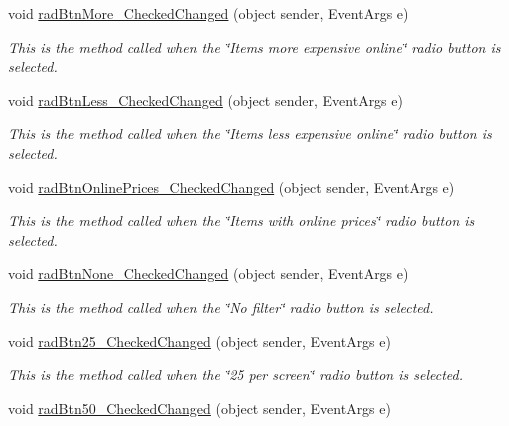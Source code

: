 \begin{DoxyCompactItemize}
void \hyperlink{class_price_comparison_form_1_1_form_price_compare_ac75092e889f0bd6a39d17568f17a17cf}{rad\-Btn\-More\-\_\-\-Checked\-Changed} (object sender, Event\-Args e)
\begin{DoxyCompactList}\small\item\em This is the method called when the \char`\"{}\-Items more expensive online\char`\"{} radio button is selected. \end{DoxyCompactList}\item 
void \hyperlink{class_price_comparison_form_1_1_form_price_compare_a0d825368f057d393f614a356593f2d6e}{rad\-Btn\-Less\-\_\-\-Checked\-Changed} (object sender, Event\-Args e)
\begin{DoxyCompactList}\small\item\em This is the method called when the \char`\"{}\-Items less expensive online\char`\"{} radio button is selected. \end{DoxyCompactList}\item 
void \hyperlink{class_price_comparison_form_1_1_form_price_compare_a71a2eec3243229776da307604a2931f6}{rad\-Btn\-Online\-Prices\-\_\-\-Checked\-Changed} (object sender, Event\-Args e)
\begin{DoxyCompactList}\small\item\em This is the method called when the \char`\"{}\-Items with online prices\char`\"{} radio button is selected. \end{DoxyCompactList}\item 
void \hyperlink{class_price_comparison_form_1_1_form_price_compare_af88870be67736e2c4780b9db680a6f1d}{rad\-Btn\-None\-\_\-\-Checked\-Changed} (object sender, Event\-Args e)
\begin{DoxyCompactList}\small\item\em This is the method called when the \char`\"{}\-No filter\char`\"{} radio button is selected. \end{DoxyCompactList}\item 
void \hyperlink{class_price_comparison_form_1_1_form_price_compare_ae546c79784691891de7c3a571aa324e9}{rad\-Btn25\-\_\-\-Checked\-Changed} (object sender, Event\-Args e)
\begin{DoxyCompactList}\small\item\em This is the method called when the \char`\"{}25 per screen\char`\"{} radio button is selected. \end{DoxyCompactList}\item 
void \hyperlink{class_price_comparison_form_1_1_form_price_compare_a4d6ea91a5d20fb06079da48854969e0f}{rad\-Btn50\-\_\-\-Checked\-Changed} (object sender, Event\-Args e)

\end{DoxyCompactItemize}

